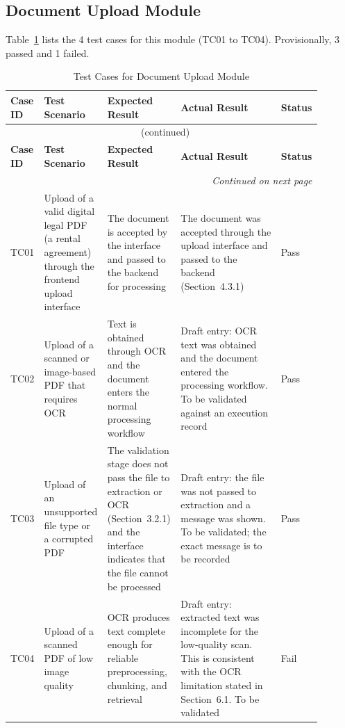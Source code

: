 \documentclass[12pt,a4paper,oneside]{report}
\begin{document}
\subsection{Document Upload Module}
Table~\ref{tab:upload} lists the 4 test cases for this module (TC01 to TC04). Provisionally, 3 passed and 1 failed.
{\footnotesize
\setlength{\tabcolsep}{3pt}
\renewcommand{\arraystretch}{1.15}
\begin{longtable}{|p{0.075\linewidth}|p{0.19\linewidth}|p{0.23\linewidth}|p{0.32\linewidth}|p{0.08\linewidth}|}
\caption{Test Cases for Document Upload Module}\label{tab:upload}\\
\hline
\textbf{Case ID} & \textbf{Test Scenario} & \textbf{Expected Result} & \textbf{Actual Result} & \textbf{Status}\\
\hline
\endfirsthead
\multicolumn{5}{c}{\tablename~\thetable{} (continued)}\\
\hline
\textbf{Case ID} & \textbf{Test Scenario} & \textbf{Expected Result} & \textbf{Actual Result} & \textbf{Status}\\
\hline
\endhead
\hline
\multicolumn{5}{r}{\emph{Continued on next page}}\\
\endfoot
\hline
\endlastfoot
TC01 & Upload of a valid digital legal PDF (a rental agreement) through the frontend upload interface & The document is accepted by the interface and passed to the backend for processing & The document was accepted through the upload interface and passed to the backend (Section~4.3.1) & Pass\\
\hline
TC02 & Upload of a scanned or image-based PDF that requires OCR & Text is obtained through OCR and the document enters the normal processing workflow & Draft entry: OCR text was obtained and the document entered the processing workflow. To be validated against an execution record & Pass\\
\hline
TC03 & Upload of an unsupported file type or a corrupted PDF & The validation stage does not pass the file to extraction or OCR (Section~3.2.1) and the interface indicates that the file cannot be processed & Draft entry: the file was not passed to extraction and a message was shown. To be validated; the exact message is to be recorded & Pass\\
\hline
TC04 & Upload of a scanned PDF of low image quality & OCR produces text complete enough for reliable preprocessing, chunking, and retrieval & Draft entry: extracted text was incomplete for the low-quality scan. This is consistent with the OCR limitation stated in Section~6.1. To be validated & Fail\\
\end{longtable}
}
\end{document}
